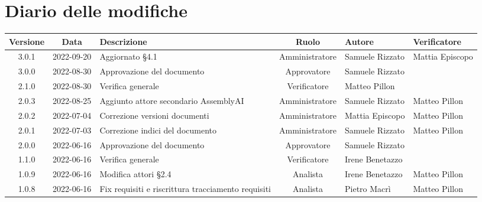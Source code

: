 \section*{Diario delle modifiche}
	\begin{center}
	\renewcommand{\arraystretch}{1.8} %
	\begin{longtable}{ |c|c|p{8em}|c|m{5em}|m{5em}| }
	\hline
	\textbf{Versione} & \textbf{Data} & \textbf{Descrizione} &  \textbf{Ruolo} &  \textbf{Autore} & \textbf{Verificatore}\\ %
	\hline
	3.0.1& 2022-09-20 & Aggiornato §4.1 & Amministratore & Samuele \newline Rizzato & Mattia \newline Episcopo \\
	\hline
	3.0.0& 2022-08-30 & Approvazione del documento & Approvatore & Samuele \newline Rizzato & \\
	\hline
	2.1.0& 2022-08-30 & Verifica generale & Verificatore & Matteo \newline Pillon & \\
	\hline
	2.0.3& 2022-08-25 & Aggiunto attore secondario AssemblyAI & Amministratore & Samuele \newline Rizzato & Matteo \newline Pillon\\
	\hline
	2.0.2& 2022-07-04 & Correzione versioni documenti & Amministratore & Mattia \newline Episcopo & Matteo \newline Pillon\\
	\hline
	2.0.1 & 2022-07-03 & Correzione indici del documento & Amministratore & Samuele \newline Rizzato & Matteo \newline Pillon\\
	\hline
	2.0.0 & 2022-06-16 & Approvazione del documento & Approvatore & Samuele \newline Rizzato & \\
	\hline
	1.1.0 & 2022-06-16 & Verifica generale & Verificatore & Irene \newline Benetazzo & \\
	\hline
	1.0.9 & 2022-06-16 & Modifica attori §2.4 & Analista & Irene \newline Benetazzo & Matteo \newline Pillon\\
	\hline
	1.0.8 & 2022-06-16 & Fix requisiti e riscrittura tracciamento requisiti & Analista & Pietro \newline Macrì & Matteo \newline Pillon\\

\end{longtable}
\end{center}
